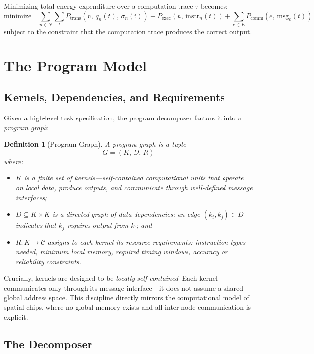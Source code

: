 \documentclass[11pt, a4paper]{article}
\newtheorem{definition}{Definition}
\begin{document}
Minimizing total energy expenditure over a computation trace $\tau$ becomes:
\[
\text{minimize} \quad \sum_{n \in N} \sum_{t} P_{\text{trans}}(n,\, q_n(t),\, \sigma_n(t))
+ P_{\text{exec}}(n,\, \text{instr}_n(t))
+ \sum_{e \in E} P_{\text{comm}}(e,\, \text{msg}_e(t))
\]
subject to the constraint that the computation trace produces the correct output.

\section{The Program Model}

\subsection{Kernels, Dependencies, and Requirements}

Given a high-level task specification, the program decomposer factors it into a
\emph{program graph}:

\begin{definition}[Program Graph]
A \emph{program graph} is a tuple
\[
G = (K,\, D,\, R)
\]
where:
\begin{itemize}
  \item $K$ is a finite set of \emph{kernels}---self-contained computational units
        that operate on local data, produce outputs, and communicate through well-defined
        message interfaces;
  \item $D \subseteq K \times K$ is a directed graph of \emph{data dependencies}: an
        edge $(k_i, k_j) \in D$ indicates that $k_j$ requires output from $k_i$; and
  \item $R : K \to \mathcal{C}$ assigns to each kernel its \emph{resource requirements}:
        instruction types needed, minimum local memory, required timing windows, accuracy
        or reliability constraints.
\end{itemize}
\end{definition}

Crucially, kernels are designed to be \emph{locally self-contained}. Each kernel
communicates only through its message interface---it does not assume a shared global
address space. This discipline directly mirrors the computational model of spatial chips,
where no global memory exists and all inter-node communication is explicit.

\subsection{The Decomposer}
\end{document}
